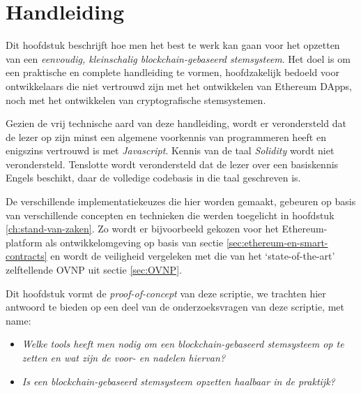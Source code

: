 


\chapter{Handleiding}
\label{ch:handleiding}

Dit hoofdstuk beschrijft hoe men het best te werk kan gaan voor het opzetten van een \textit{eenvoudig, kleinschalig blockchain-gebaseerd stemsysteem}. Het doel is om een praktische en complete handleiding te vormen, hoofdzakelijk bedoeld voor ontwikkelaars die niet vertrouwd zijn met het ontwikkelen van Ethereum DApps, noch met het ontwikkelen van cryptografische stemsystemen. 

Gezien de vrij technische aard van deze handleiding, wordt er verondersteld dat de lezer op zijn minst een algemene voorkennis van programmeren heeft en enigszins vertrouwd is met \textit{Javascript}. Kennis van de taal \textit{Solidity} wordt niet verondersteld. Tenslotte wordt verondersteld dat de lezer over een basiskennis Engels beschikt, daar de volledige codebasis in die taal geschreven is. 

De  verschillende implementatiekeuzes die hier worden gemaakt, gebeuren op basis van verschillende concepten en technieken die werden toegelicht in hoofdstuk \ref{ch:stand-van-zaken}. Zo wordt er bijvoorbeeld gekozen voor het Ethereum-platform als ontwikkelomgeving op basis van sectie \ref{sec:ethereum-en-smart-contracts} en wordt de veiligheid vergeleken met die van het `state-of-the-art' zelftellende OVNP \autocite{McCorry2017} uit sectie \ref{sec:OVNP}.

Dit hoofdstuk vormt de \textit{proof-of-concept} van deze scriptie, we trachten hier antwoord te bieden op een deel van de onderzoeksvragen van deze scriptie, met name: 
\begin{itemize}
	\item \textit{Welke tools heeft men nodig om een blockchain-gebaseerd stemsysteem op te zetten en wat zijn de voor- en nadelen hiervan?}
	\item \textit{Is een blockchain-gebaseerd stemsysteem opzetten haalbaar in de praktijk?} 
\end{itemize}


